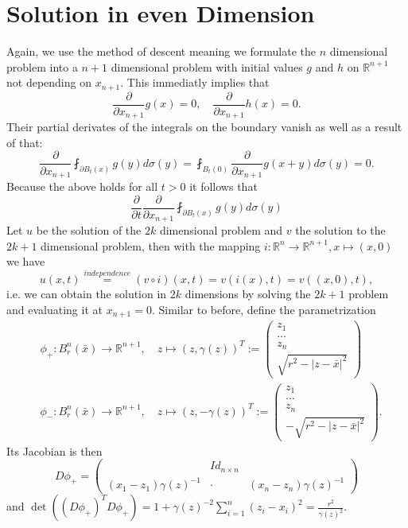 \documentclass[A4,12pt,twoside]{book}
\begin{document}
\section{Solution in even Dimension}
Again, we use the method of descent meaning we formulate the $n$ dimensional problem into a $n+1$ dimensional problem with initial values $g$ and $h$ on $\mathbb{R}^{n+1}$ not depending on $x_{n+1}$. This immediatly implies that 
\[
\frac{\partial}{\partial x_{n+1}} g(x) =0, \quad \frac{\partial}{\partial x_{n+1}} h(x) =0.
\]
Their partial derivates of the integrals on the boundary vanish as well as a result of that: 
\[
\frac{\partial}{\partial x_{n+1}} \fint_{\partial B_t(x)} g(y) d\sigma (y) = \fint_{ B_t(0)} \frac{\partial}{\partial x_{n+1}} g(x+y) d\sigma (y) = 0.
\]
Because the above holds for all $t>0$ it follows that 
\[
\frac{\partial}{\partial t} \frac{\partial}{\partial x_{n+1}} \fint_{\partial B_t(x)} g(y) d\sigma (y)
\]
Let $u$ be the solution of the $2k$ dimensional problem and $v$ the solution to the $2k+1$ dimensional problem, then with the mapping $i: \mathbb{R}^n \to \mathbb{R}^{n+1}, x \mapsto (x,0)$ we have 
\[
u(x,t) \stackrel{independence}{=} (v \circ i) (x,t) = v(i(x),t) = v((x,0),t), 
\]
i.e. we can obtain the solution in $2k$ dimensions by solving the $2k+1$ problem and evaluating it at $x_{n+1}=0$. Similar to before, define the parametrization 
\begin{align*}
     & \phi_+ : B_r^n (\bar{x}) \to \mathbb{R}^{n+1}, \quad z \mapsto (z,\gamma(z))^T := \begin{pmatrix}
        z_1 \\ \hdots\\ z_n \\ \sqrt{r^2 -|z-\bar{x}|^2}
    \end{pmatrix} \\
    & \phi_- : B_r^n (\bar{x}) \to \mathbb{R}^{n+1}, \quad z \mapsto (z,-\gamma(z))^T := \begin{pmatrix}
        z_1 \\ \hdots \\ z_n \\ -\sqrt{r^2 -|z-\bar{x}|^2}
    \end{pmatrix} .
\end{align*}
Its Jacobian is then 
\[
D\phi_+ = \begin{pmatrix}
  &  Id_{n\times n}& \\
  (x_1 - z_1) \gamma (z)^{-1} & \cdot & (x_n - z_n) \gamma (z)^{-1} 
\end{pmatrix}
\]
and $\det ( (D\phi_+)^T D\phi_+ ) = 1 + \gamma (z)^{-2} \sum_{i=1}^n (z_i -x_i)^2= \frac{r^2}{\gamma (z)^2} $.\\
\end{document}
